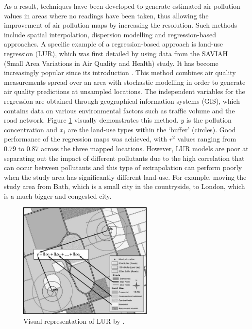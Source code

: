 \documentclass[11pt,twosided,a4paper]{report}
\begin{document}
As a result, techniques have been developed to generate estimated air pollution values in areas where no readings have been taken, thus allowing the improvement of air pollution maps by increasing the resolution. Such methods include spatial interpolation, dispersion modelling and regression-based approaches. A specific example of a regression-based approach is land-use regression (LUR), which was first detailed by \cite{Briggs1997mappingGIS} using data from the SAVIAH (Small Area Variations in Air Quality and Health) study. It has become increasingly popular since its introduction \citep{Hoek2008LUR}. This method combines air quality measurements spread over an area with stochastic modelling in order to generate air quality predictions at unsampled locations. The independent variables for the regression are obtained through geographical-information systems (GIS), which contains data on various environmental factors such as traffic volume and the road network. Figure \ref{LURexplanation} visually demonstrates this method. $y$ is the pollution concentration and $x_i$ are the land-use types within the `buffer' (circles). Good performance of the regression maps was achieved, with $r^2$ values ranging from 0.79 to 0.87 across the three mapped locations. However, LUR models are poor at separating out the impact of different pollutants due to the high correlation that can occur between pollutants \citep{Hoek2008LUR} and this type of extrapolation can perform poorly when the study area has significantly different land-use. For example, moving the study area from Bath, which is a small city in the countryside, to London, which is a much bigger and congested city.

\begin{figure}[!htbp]
\centering
\includegraphics[width=0.6\textwidth]{LURexplanation}
\caption{Visual representation of LUR by \cite{Jerrett2005evalmapmodels}.}
\label{LURexplanation}
\end{figure}
\end{document}
